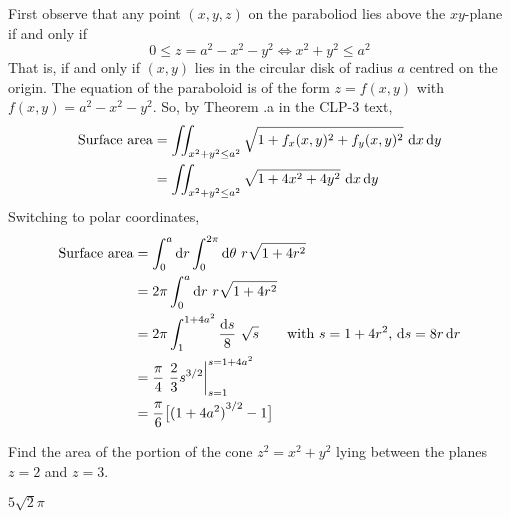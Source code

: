 \begin{solution}
First observe that any point $(x,y,z)$ on the paraboliod lies above the $xy$-plane if and only if
\begin{equation*}
0\le z = a^2-x^2-y^2
\iff x^2+y^2\le a^2
\end{equation*} 
That is, if and only if $(x,y)$ lies in the circular disk of radius $a$
centred on the origin. The equation of the paraboloid is of the form 
$z=f(x,y)$ with $f(x,y)=a^2-x^2-y^2$. So, by 
Theorem .a in the CLP-3 text,
\begin{align*}
\text{Surface area}
&= \dblInt_{x^2+y^2\le a^2}\sqrt{1+f_x(x,y)^2+f_y(x,y)^2}\ \dee{x}\,\dee{y} \\
&= \dblInt_{x^2+y^2\le a^2}\sqrt{1+4x^2+4y^2}\ \dee{x}\,\dee{y}
\end{align*}
Switching to polar coordinates,
\begin{align*}
\text{Surface area}
&= \int_0^a\mathrm{d}r\int_0^{2\pi}\mathrm{d}\theta\ r\sqrt{1+4r^2}\\
&= 2\pi \int_0^a\mathrm{d}r\ r\sqrt{1+4r^2}\\
&= 2\pi \int_1^{1+4a^2}\frac{\mathrm{d}s}{8}\ \sqrt{s}\qquad
\text{with $s=1+4r^2$, $\mathrm{d}s=8r\,\mathrm{d}r$} \\
&=\frac{\pi}{4}\ \frac{2}{3}s^{3/2}\bigg|_{s=1}^{s=1+4a^2} \\
&=\frac{\pi}{6}\big[{(1+4a^2)}^{3/2}-1\big]
\end{align*}

\end{solution}


\begin{question}[M253 2014D] %
Find the area of the portion of the cone $z^2 = x^2 + y^2$ 
lying between the planes $z = 2$ and $z = 3$.
\end{question}


\begin{answer}
$5\sqrt{2}\pi$
\end{answer}

